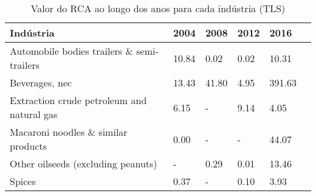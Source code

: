 \begin{table}
\centering
\caption{Valor do RCA ao longo dos anos para cada indústria (TLS)}
\label{tab:ex3-tempo-TLS}
\begin{tabular}{p{6cm}p{1.5cm}p{1.5cm}p{1.5cm}p{1.5cm}p{1.5cm}}
\toprule
                                 Indústria &  2004 &  2008 & 2012 &   2016 \\
\midrule
Automobile bodies trailers \& semi-trailers & 10.84 &  0.02 & 0.02 &  10.31 \\
                            Beverages, nec & 13.43 & 41.80 & 4.95 & 391.63 \\
Extraction crude petroleum and natural gas &  6.15 &     - & 9.14 &   4.05 \\
       Macaroni noodles \& similar products &  0.00 &     - &    - &  44.07 \\
        Other oilseeds (excluding peanuts) &     - &  0.29 & 0.01 &  13.46 \\
                                    Spices &  0.37 &     - & 0.10 &   3.93 \\
\bottomrule
\end{tabular}
\end{table}
